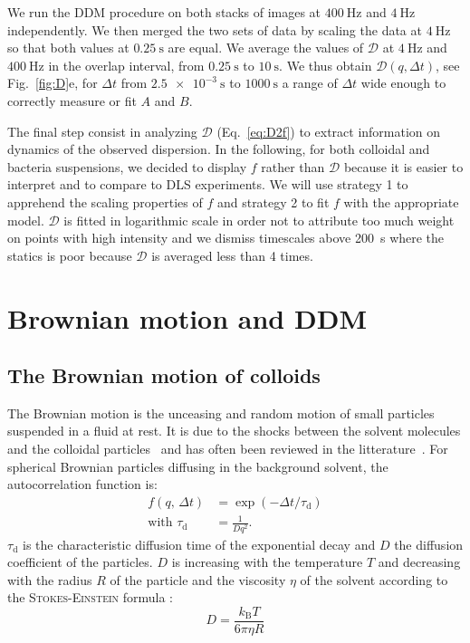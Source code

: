 \documentclass[prb,twocolumn,amsmath,amssymb]{revtex4-1}
\begin{document}
We run the DDM procedure on both stacks of images at $\SI{400}{\hertz}$ and $\SI{4}{\hertz}$ independently. We then merged the two sets of data by scaling the data at $\SI{4}{\hertz}$ so that both values at $\SI{0.25}{\second}$ are equal. We average the values of $\mathcal{D}$ at $\SI{4}{\hertz}$ and $\SI{400}{\hertz}$ in the overlap interval, from $\SI{0.25}{\second}$ to $\SI{10}{\second}$. We thus obtain $\mathcal{D} (q, \Delta t)$, see Fig.~\ref{fig:D}e, for $\Delta t$ from $\SI{2.5e-3}{\second}$ to $\SI{1000}{\second}$ a range of $\Delta t$ wide enough to correctly measure or fit $A$ and $B$.

The final step consist in analyzing $\mathcal{D}$ (Eq.~\ref{eq:D2f}) to extract information on dynamics of the observed dispersion. In the following, for both colloidal and bacteria suspensions, we decided to display $f$ rather than $\mathcal{D}$ because it is easier to interpret and to compare to DLS experiments. We will use strategy 1 to apprehend the scaling properties of $f$ and strategy 2 to fit $f$ with the appropriate model. $\mathcal{D}$ is fitted in logarithmic scale in order not to attribute too much weight on points with high intensity and we dismiss timescales above \SI{200}{\second} where the statics is poor because $\mathcal{D}$ is averaged less than 4 times.

\section{Brownian motion and DDM}
\label{sec:BrownSection}

\subsection{The Brownian motion of colloids}
The Brownian motion is the unceasing and random motion of small particles suspended in a fluid at rest. It is due to the shocks between the solvent molecules and the colloidal particles~\cite{13_brown1828brief,9_einstein1906theory, 14_sutherland1905lxxv, 10_von1906kinetischen,ajp1997lemons,22_perrin2014atomes} and has often been reviewed in the litterature~\cite{ajp1997lemons,Nelson2004, ajp2006newburgh, ajp2006bergstein, Pearle2010}. For spherical Brownian particles  diffusing in the  background solvent, the autocorrelation function is\cite{18_sartor2003dynamic, ajp1999goldburg,ajp1969clark,8_berne2000dynamic}:
\begin{align}
f(q, \, \Delta t) &= \exp(-\Delta t/\tau_\text{d})
\label{eq:fdiff}\\
\text{with }\tau_\text{d} &= \frac{1}{Dq^2}.
\label{eq:relax}
\end{align}
$\tau_\text{d}$ is the characteristic diffusion time of the exponential decay and $D$ the diffusion coefficient of the particles. $D$ is increasing with the temperature $T$ and decreasing with the radius $R$ of the particle and the viscosity $\eta$ of the solvent according to the \textsc{Stokes-Einstein} formula \cite{Nelson2004, 16_CollSusp, ajp1997lemons, ajp2007jia}:
\begin{equation}
D = \frac{k_\text{B} T}{6 \pi \eta R}
\label{eq:se}
\end{equation}
\end{document}
